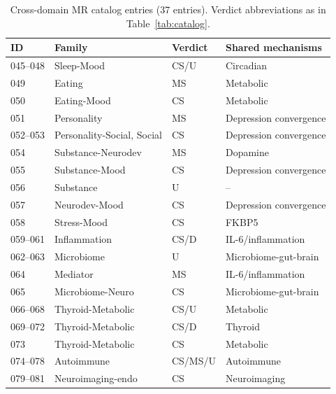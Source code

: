 \documentclass{article}
\begin{document}
\begin{table}[h]
\centering
\caption{Cross-domain MR catalog entries (37 entries). Verdict abbreviations as in Table~\ref{tab:catalog}.}
\label{tab:expanded}
\footnotesize
\begin{tabular}{llll}
\toprule
ID & Family & Verdict & Shared mechanisms \\
\midrule
045--048 & Sleep-Mood & CS/U & Circadian \\
049 & Eating & MS & Metabolic \\
050 & Eating-Mood & CS & Metabolic \\
051 & Personality & MS & Depression convergence \\
052--053 & Personality-Social, Social & CS & Depression convergence \\
054 & Substance-Neurodev & MS & Dopamine \\
055 & Substance-Mood & CS & Depression convergence \\
056 & Substance & U & -- \\
057 & Neurodev-Mood & CS & Depression convergence \\
058 & Stress-Mood & CS & FKBP5 \\
059--061 & Inflammation & CS/D & IL-6/inflammation \\
062--063 & Microbiome & U & Microbiome-gut-brain \\
064 & Mediator & MS & IL-6/inflammation \\
065 & Microbiome-Neuro & CS & Microbiome-gut-brain \\
066--068 & Thyroid-Metabolic & CS/U & Metabolic \\
069--072 & Thyroid-Metabolic & CS/D & Thyroid \\
073 & Thyroid-Metabolic & CS & Metabolic \\
074--078 & Autoimmune & CS/MS/U & Autoimmune \\
079--081 & Neuroimaging-endo & CS & Neuroimaging \\
\bottomrule
\end{tabular}
\end{table}
\end{document}
